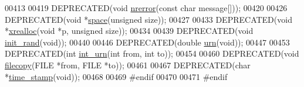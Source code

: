 \begin{DoxyCode}
00413 
00419 DEPRECATED(\textcolor{keywordtype}{void} \hyperlink{utils_8h_a127ce946e56b5a5773781cabe68e38c5}{nrerror}(\textcolor{keyword}{const} \textcolor{keywordtype}{char} message[]));
00420 
00426 DEPRECATED(\textcolor{keywordtype}{void} *\hyperlink{utils_8h_ad7e1e137b3bf1f7108933d302a7f0177}{space}(\textcolor{keywordtype}{unsigned} size));
00427 
00433 DEPRECATED(\textcolor{keywordtype}{void} *\hyperlink{utils_8h_a9037ada838835b1b9db41581a021b0c8}{xrealloc}(\textcolor{keywordtype}{void} *p, \textcolor{keywordtype}{unsigned} size));
00434 
00439 DEPRECATED(\textcolor{keywordtype}{void} \hyperlink{utils_8h_a8aaa6d9be6f803f496d9b97375c371f3}{init\_rand}(\textcolor{keywordtype}{void}));
00440 
00446 DEPRECATED(\textcolor{keywordtype}{double} \hyperlink{utils_8h_aaa328491c84996e445d027fde9800f2e}{urn}(\textcolor{keywordtype}{void}));
00447 
00453 DEPRECATED(\textcolor{keywordtype}{int} \hyperlink{utils_8h_a68ff0849d44f62fe491800378a5ffcb4}{int\_urn}(\textcolor{keywordtype}{int} from, \textcolor{keywordtype}{int} to));
00454 
00460 DEPRECATED(\textcolor{keywordtype}{void} \hyperlink{utils_8h_ab213334ce977b6d21611cdea6b80c3bf}{filecopy}(FILE *from, FILE *to));
00461 
00467 DEPRECATED(\textcolor{keywordtype}{char} *\hyperlink{utils_8h_a7afeb906cb36e9d77379eabc6907ac46}{time\_stamp}(\textcolor{keywordtype}{void}));
00468 
00469 \textcolor{preprocessor}{#endif}
00470 
00471 \textcolor{preprocessor}{#endif}
\end{DoxyCode}
